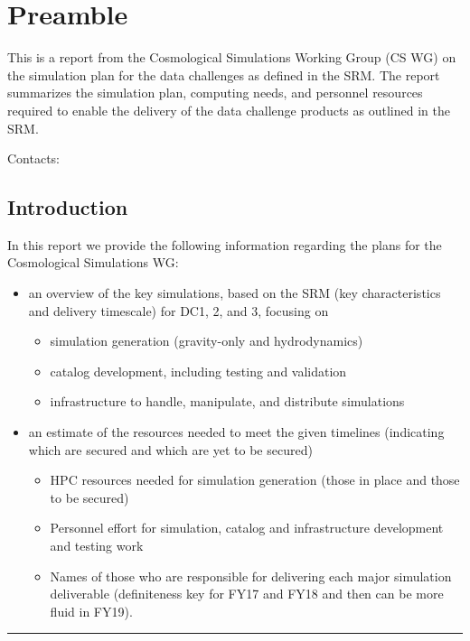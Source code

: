 \section{Preamble}
\resetnumbering
\label{sec:preamble}

This is a report from the Cosmological Simulations Working Group (CS WG) on the simulation plan for the data challenges as defined in the SRM. The report summarizes the simulation plan, computing needs, and personnel resources required to enable the delivery of the data challenge products as outlined in the SRM.

\vspace{\baselineskip}

Contacts: 



\subsection{Introduction}
\label{sec:preamble:introduction}

In this report we provide the following information regarding the plans for the Cosmological Simulations WG:

\begin{itemize}
   \item    an overview of the key simulations, based on the SRM (key characteristics and delivery timescale) for DC1, 2, and 3, focusing on
     \begin{itemize}
        \item        simulation generation (gravity-only and hydrodynamics)
        \item        catalog development, including testing and validation
        \item        infrastructure to handle, manipulate, and distribute simulations
     \end{itemize}
   \item    an estimate of the resources needed to meet the given timelines (indicating which are secured and which are yet to be secured)
     \begin{itemize}
        \item        HPC resources needed for simulation generation (those in place and those to be secured)
        \item        Personnel effort for simulation, catalog and infrastructure development and testing work
        \item        Names of those who are responsible for delivering each major simulation deliverable (definiteness key for FY17 and FY18 and then can be more fluid in FY19).
     \end{itemize}
\end{itemize}


\vspace{\baselineskip}
\hrule
\clearpage
